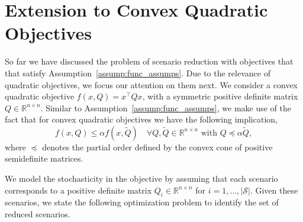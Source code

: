\documentclass{article}
\newcommand{\mS}{\mathcal{S}}
\newcommand{\R}{\mathbb{R}}
\begin{document}
\section{Extension to Convex Quadratic Objectives}
\label{sec:extensions}
So far we have discussed the problem of scenario reduction with
objectives that that satisfy Assumption~\ref{assump:func_assumps}.
Due to the relevance of quadratic objectives, we focus our attention
on them next. %
We consider a convex quadratic objective %
	$f(x,Q) = x^\top Q x$,%
with a symmetric positive definite matrix \(Q\in\R^{n\times n}\).
Similar to Assumption~\ref{assump:func_assumps}, we make use of the fact that for convex quadratic objectives we have the following implication,
\begin{equation*}
	f(x,Q) \leq \alpha f(x,\tilde{Q}) \quad \forall Q,\tilde{Q} \in \R^{n \times n} \text{ with } Q\preceq \alpha\tilde{Q},
\end{equation*}  
where $\preceq$ denotes the partial order defined by the convex cone of positive semidefinite matrices.

We model the stochasticity in the objective by assuming that each
scenario corresponds to a positive definite matrix \(Q_i\in\R^{n\times n}\) for \(i=1,\ldots,|\mS|\).
Given these scenarios, we state the following optimization problem to identify the set of reduced scenarios. 
\end{document}
